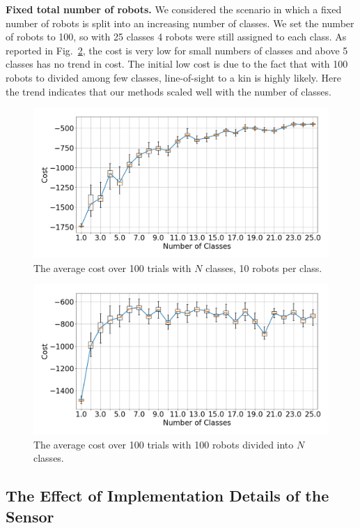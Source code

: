 \documentclass[letterpaper, 10 pt, conference]{ieeeconf}
\newcommand{\myparagraph}[1]{\textbf{#1.}}
\begin{document}
\myparagraph{Fixed total number of robots}
We considered the scenario in which a fixed number of robots is split into an
increasing number of classes. We set the number of robots to 100, so with 25
classes 4 robots were still assigned to each class. As reported in
Fig.~\ref{fig:num_classes_100}, the cost is very low for small numbers of classes
and above 5 classes has no trend in cost. The initial low cost is due to the fact that
with 100 robots to divided among few classes, line-of-sight to a kin is highly likely.
Here the trend indicates that our methods scaled well with the number of classes.

\begin{figure}[t]
  \centering
  \includegraphics[width=0.9\linewidth]{./images/num_classes_vs_cost_10_per_class}
  \caption{The average cost over 100 trials with $N$ classes, 10 robots per class.}
  \label{fig:num_classes_10}
\end{figure}

\begin{figure}[t]
  \centering
  \includegraphics[width=0.9\linewidth]{./images/num_classes_vs_cost_100_robots}
  \caption{The average cost over 100 trials with 100 robots divided into $N$ classes.}
  \label{fig:num_classes_100}
\end{figure}

\subsection{The Effect of Implementation Details of the Sensor} \label{section:sensor_impl}
\end{document}
